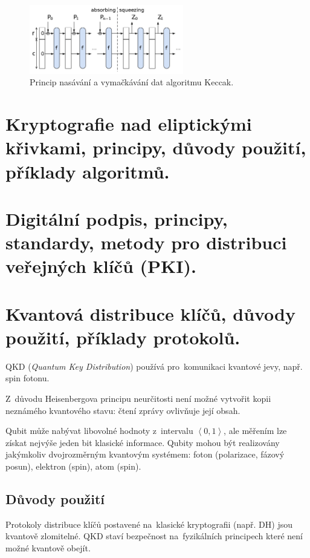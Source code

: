 \begin{figure}
    \centering
    \includegraphics[width=0.6\textwidth]{img/sponge-construction}
    \caption{Princip nasávání a vymačkávání dat algoritmu Keccak.}
    \label{keccak}
\end{figure}


\clearpage
\section{Kryptografie nad eliptickými křivkami, principy, důvody použití, příklady algoritmů.}


\clearpage
\section{Digitální podpis, principy, standardy, metody pro distribuci veřejných klíčů (PKI).}


\clearpage
\section{Kvantová distribuce klíčů, důvody použití, příklady protokolů.}

QKD (\emph{Quantum Key Distribution}) používá pro~komunikaci kvantové jevy, např. spin fotonu.

Z~důvodu Heisenbergova principu neurčitosti není možné vytvořit kopii neznámého kvantového stavu: čtení zprávy ovlivňuje její obsah.

Qubit může nabývat libovolné hodnoty z~intervalu $\left<0,1\right>$, ale měřením lze získat nejvýše jeden bit klasické informace.
Qubity mohou být realizovány jakýmkoliv dvojrozměrným kvantovým systémem: foton (polarizace, fázový posun), elektron (spin), atom (spin).


\subsection{Důvody použití}

Protokoly distribuce klíčů postavené na~klasické kryptografii (např. DH) jsou kvantově zlomitelné.
QKD staví bezpečnost na~fyzikálních principech které není možné kvantově obejít.

